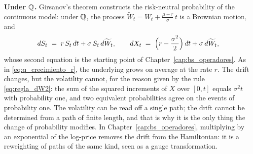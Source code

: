 \noindent\textbf{Under $\mathbb{Q}$.}
Girsanov's theorem \cite[Section~4.4]{tfgm} constructs the risk-neutral
probability of the continuous model: under $\mathbb{Q}$, the process
$\widetilde W_t = W_t + \frac{\mu - r}{\sigma}\,t$ is a Brownian motion,
and
\begin{equation}\label{eq:bs_eds_Q}
  dS_t \;=\; r\, S_t\, dt + \sigma\, S_t\, d\widetilde W_t,
  \qquad
  dX_t \;=\; \Bigl(r - \frac{\sigma^2}{2}\Bigr)\, dt
  + \sigma\, d\widetilde W_t,
\end{equation}
whose second equation is the starting point of
Chapter~\ref{cap:bs_operadores}\enprep. As in \eqref{eq:q_crecimiento_r},
the underlying grows on average at the rate $r$. The drift changes, but
the volatility cannot, for the reason given by the rule
\eqref{eq:regla_dW2}: the sum of the squared increments of $X$ over
$[0, t]$ equals $\sigma^2 t$ with probability one, and two equivalent
probabilities agree on the events of probability one. The volatility
can be read off a single path; the drift cannot be determined from a
path of finite length, and that is why it is the only thing the change
of probability modifies. In Chapter~\ref{cap:bs_operadores}\enprep,
multiplying by an exponential of the log-price removes the drift from
the Hamiltonian: it is a reweighting of paths of the same kind, seen as
a gauge transformation.

